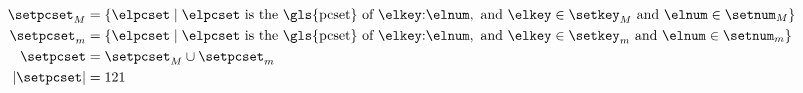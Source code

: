 


\begin{equation}
    \label{eq:pcsets}
    \begin{split}
    \setpcset_M &= \{ \elpcset \mid \elpcset \text{ is the \gls{pcset} of }
    \elkey\text{:}\elnum, \text{ and }
    \elkey \in \setkey_M \text{ and } \elnum \in \setnum_M  \} \\
    \setpcset_m &= \{ \elpcset \mid \elpcset \text{ is the \gls{pcset} of }
    \elkey\text{:}\elnum, \text{ and }
    \elkey \in \setkey_m \text{ and } \elnum \in \setnum_m  \} \\
    \setpcset &= \setpcset_M \cup \setpcset_m \\
    | \setpcset | &= 121 \\    
    \end{split}
\end{equation}
